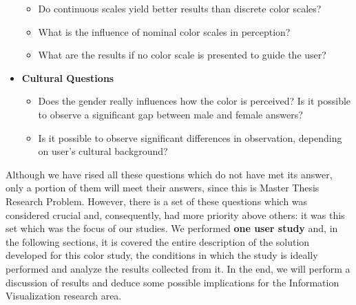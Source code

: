 \begin{itemize}
    \begin{itemize}
    	\setlength\itemsep{0.1em}
			\item Do continuous scales yield better results than discrete color scales?
      \item What is the influence of nominal color scales in perception?
      \item What are the results if no color scale is presented to guide the user?
		\end{itemize}
  \item \textbf{Cultural Questions}
    \begin{itemize}
    	\setlength\itemsep{0.1em}
			\item Does the gender really influences how the color is perceived? Is it possible to observe a significant gap between
			male and female answers?
			\item Is it possible to observe significant differences in observation, depending on user's cultural background?
		\end{itemize}
\end{itemize} \par
%
Although we have rised all these questions which do not have met its answer, only a portion of them will meet their answers,
since this is Master Thesis Research Problem. However, there is a set of these questions which was considered crucial and, consequently,
had more priority above others: it was this set which was the focus of our studies. We performed \textbf{one user study} and,
in the following sections, it is covered the entire description of the solution developed for this color study, the conditions in which
the study is ideally performed and analyze the results collected from it. In the end, we will perform a discussion of results and deduce
some possible implications for the Information Visualization research area.
%
